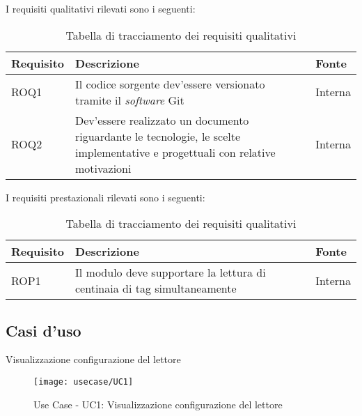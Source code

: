 I requisiti qualitativi rilevati sono i seguenti:
\begin{table}[h!]
    \label{tab:requisiti-qual}
    \begin{tabularx}{\textwidth}{ | X | X | X |}
    \hline
    \textbf{Requisito} & \textbf{Descrizione} & \textbf{Fonte}\\
    \hline
    ROQ1 & Il codice sorgente dev'essere versionato tramite il \emph{software} Git & Interna \\
    \hline
    ROQ2 & Dev'essere realizzato un documento riguardante le tecnologie, le scelte implementative e progettuali con relative motivazioni & Interna \\
    \hline
    \end{tabularx}
    \caption{Tabella di tracciamento dei requisiti qualitativi}
\end{table}

I requisiti prestazionali rilevati sono i seguenti:
\begin{table}[h!]
    \label{tab:requisiti-pre}
    \begin{tabularx}{\textwidth}{ | X | X | X |}
    \hline
    \textbf{Requisito} & \textbf{Descrizione} & \textbf{Fonte}\\
    \hline
    ROP1 & Il modulo deve supportare la lettura di centinaia di tag simultaneamente & Interna \\
    \hline
    \end{tabularx}
    \caption{Tabella di tracciamento dei requisiti qualitativi}
\end{table}


\subsection{Casi d'uso}
\label{sub-sec:use-case}

\begin{usecase}{1}{Visualizzazione configurazione del lettore}
\label{uc:1}
\end{usecase}

\begin{figure}[!h] 
    \centering 
    \texttt{[image: usecase/UC1]} 
    \caption{Use Case - UC1: Visualizzazione configurazione del lettore}
\end{figure}

